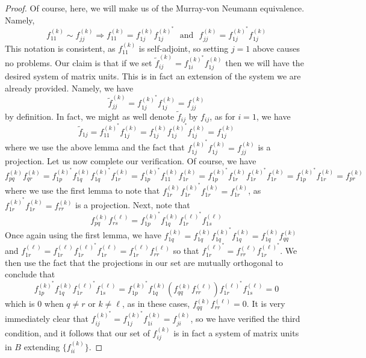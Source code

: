 \documentclass[aps,pra,showpacs,notitlepage,onecolumn,superscriptaddress,nofootinbib]{revtex4-1}
\theoremstyle{definition}
\begin{document}
\begin{proof}
  Of course, here, we will make us of the Murray-von Neumann equivalence. Namely,
  \begin{equation}
    f_{11}^{(k)} \sim f_{jj}^{(k)} \Longrightarrow f_{11}^{(k)} = f_{1j}^{(k)} f_{1j}^{(k)^{*}} \ \ \ \text{and} \ \ \ f_{jj}^{(k)} = f_{1j}^{(k)^{*}} f_{1j}^{(k)}
  \end{equation}
  This notation is consistent, as $f_{11}^{(k)}$ is self-adjoint, so setting $j = 1$ above causes no problems.
  Our claim is that if we set $\widetilde{f}_{ij}^{(k)} = f_{1i}^{(k)^{*}} f_{1j}^{(k)}$ then we will have the desired system of matrix units. This is in fact an extension of the system we are already provided. Namely, we have
  \begin{equation}
    \widetilde{f}_{jj}^{(k)} = f_{1j}^{(k)^{*}} f_{1j}^{(k)} = f_{jj}^{(k)}
  \end{equation}
  by definition. In fact, we might as well denote $\widetilde{f}_{ij}$ by $f_{ij}$, as for $i = 1$, we have
  \begin{equation}
    \widetilde{f}_{1j} = f_{11}^{(k)^{*}} f_{1j}^{(k)} = f_{1j}^{(k)} f_{1j}^{(k)^{*}} f_{1j}^{(k)} = f_{1j}^{(k)}
    \end{equation}
  where we use the above lemma and the fact that $f_{1j}^{(k)^{*}} f_{1j}^{(k)} = f_{jj}^{(k)}$ is a projection. Let us now complete our verification. Of course, we have
  \begin{equation}
    f_{pq}^{(k)} f_{qr}^{(k)} = f_{1p}^{(k)^{*}} f_{1q}^{(k)} f_{1q}^{(k)^{*}} f_{1r}^{(k)} = f_{1p}^{(k)^{*}} f_{11}^{(k)} f_{1r}^{(k)} = f_{1p}^{(k)^{*}} f_{1r}^{(k)} f_{1r}^{(k)^{*}} f_{1r}^{(k)} = f_{1p}^{(k)^{*}} f_{1r}^{(k)} = f_{pr}^{(k)}
  \end{equation}
  where we use the first lemma to note that $f_{1r}^{(k)} f_{1r}^{(k)^{*}} f_{1r}^{(k)} = f_{1r}^{(k)}$, as $f_{1r}^{(k)^{*}} f_{1r}^{(k)} = f_{rr}^{(k)}$ is a projection. Next, note that
  \begin{equation}
    f_{pq}^{(k)} f_{rs}^{(\ell)} = f_{1p}^{(k)^{*}} f_{1q}^{(k)} f_{1r}^{(\ell)^{*}} f_{1s}^{(\ell)}
  \end{equation}
  Once again using the first lemma, we have $f_{1q}^{(k)} = f_{1q}^{(k)} f_{1q}^{(k)^{*}} f_{1q}^{(k)} =  f_{1q}^{(k)}  f_{qq}^{(k)}$ and $f_{1r}^{(\ell)} = f_{1r}^{(\ell)} f_{1r}^{(\ell)^{*}} f_{1r}^{(\ell)} =  f_{1r}^{(\ell)} f_{rr}^{(\ell)}$
  so that $f_{1r}^{(\ell)^{*}} = f_{rr}^{(\ell)} f_{1r}^{(\ell)^{*}}$. We then use the fact that the projections in our set are mutually orthogonal to conclude that
  \begin{equation}
    f_{1p}^{(k)^{*}} f_{1q}^{(k)} f_{1r}^{(\ell)^{*}} f_{1s}^{(\ell)} = f_{1p}^{(k)^{*}} f_{1q}^{(k)} (f_{qq}^{(k)}  f_{rr}^{(\ell)}) f_{1r}^{(\ell)^{*}} f_{1s}^{(\ell)} = 0
  \end{equation}
  which is $0$ when $q \neq r$ or $k \neq \ell$, as in these cases, $f_{qq}^{(k)}  f_{rr}^{(\ell)} = 0$. It is very immediately clear that $f_{ij}^{(k)^{*}} = f_{1j}^{(k)^{*}} f_{1i}^{(k)} = f_{ji}^{(k)}$,
  so we have verified the third condition, and it follows that our set of $f_{ij}^{(k)}$ is in fact a system of matrix units in $B$ extending $\{f_{ii}^{(k)}\}$.
\end{proof}
\end{document}
